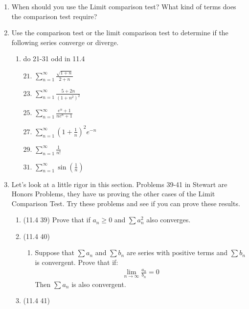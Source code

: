 \documentclass[12pt]{article}
\begin{document}
\begin{enumerate}
     \addtocounter{enumi}{22}\item When should you use the Limit comparison test? What kind of terms does the comparison test require?
     \item Use the comparison test or the limit comparison test to determine if the following series converge or diverge.
     \begin{enumerate}
         \item do 21-31 odd in 11.4
         \item[$21.$]$\sum^\infty_{n=1}\frac{\sqrt{1+n}}{2+n}$
         \item[$23.$]$\sum^\infty_{n=1}\frac{5+2n}{(1+n^2)^2}$
         \item[$25.$]$\sum^\infty_{n=1}\frac{e^n+1}{ne^n+1}$
         \item[$27.$]$\sum^\infty_{n=1}\left(1+\frac{1}{n}\right)^2e^{-n}$
         \item[$29.$]$\sum^\infty_{n=1}\frac{1}{n!}$         \item[$31.$]$\sum^\infty_{n=1}\sin{\left(\frac{1}{n}\right)}$ 
         
     \end{enumerate}
     \item Let's look at a little rigor in this section. Problems 39-41 in Stewart are Honors Problems, they have us proving the other cases of the Limit Comparison Test. Try these problems and see if you can prove these results.
     \begin{enumerate}
         \item (11.4 39) 
         Prove that if $a_n \geq 0$ and $\sum a_n^2$ also converges.
         \item (11.4 40)
         \begin{enumerate}
             \item Suppose that $\sum a_n$ and $\sum b_n$ are series with positive terms and $\sum b_n$ is convergent. Prove that if:
            \begin{gather*}
                \lim_{n\to\infty}\frac{a_n}{b_n}=0
            \end{gather*}   
            Then $\sum a_n$ is also convergent.
         \end{enumerate}
         \item (11.4 41)
     \end{enumerate}
\end{enumerate}
\end{document}
